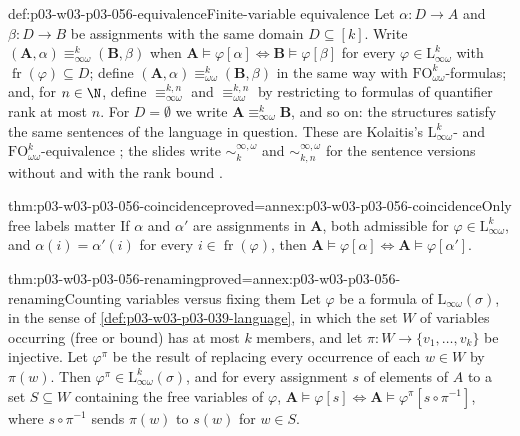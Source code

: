 \begin{hbdefinition}{def:p03-w03-p03-056-equivalence}{Finite-variable equivalence}
Let \(\alpha:D\to A\) and \(\beta:D\to B\) be assignments with the same
domain \(D\subseteq[k]\). Write
\((\mathbf A,\alpha)\equiv^k_{\infty\omega}(\mathbf B,\beta)\) when
\(\mathbf A\models\varphi[\alpha]\iff\mathbf B\models\varphi[\beta]\) for
every \(\varphi\in\mathrm{L}^k_{\infty\omega}\) with
\(\operatorname{fr}(\varphi)\subseteq D\); define
\((\mathbf A,\alpha)\equiv^k_{\omega\omega}(\mathbf B,\beta)\) in the same
way with \(\mathrm{FO}^k_{\omega\omega}\)-formulas; and, for \(n\in\N\),
define \(\equiv^{k,n}_{\infty\omega}\) and \(\equiv^{k,n}_{\omega\omega}\) by
restricting to formulas of quantifier rank at most \(n\). For \(D=\emptyset\)
we write \(\mathbf A\equiv^k_{\infty\omega}\mathbf B\), and so on: the
structures satisfy the same sentences of the language in question. These are
Kolaitis's \(\mathrm{L}^k_{\infty\omega}\)- and
\(\mathrm{FO}^k_{\omega\omega}\)-equivalence
\cite[Def.~7.8, p.~57]{Kolaitis2003ExpressivePowerNotes}; the slides
write \(\sim^{\infty,\omega}_{k}\) and \(\sim^{\infty,\omega}_{k,n}\) for the
sentence versions without and with the rank bound
\cite[p.~13]{TechnionLMC2009Lecture4}.
\end{hbdefinition}

\begin{hblemma}{thm:p03-w03-p03-056-coincidence}{proved=annex:p03-w03-p03-056-coincidence}{Only free labels matter}
If \(\alpha\) and \(\alpha'\) are assignments in \(\mathbf A\), both
admissible for \(\varphi\in\mathrm{L}^k_{\infty\omega}\), and
\(\alpha(i)=\alpha'(i)\) for every \(i\in\operatorname{fr}(\varphi)\), then
\(\mathbf A\models\varphi[\alpha]\iff\mathbf A\models\varphi[\alpha']\).
\end{hblemma}

\begin{hblemma}{thm:p03-w03-p03-056-renaming}{proved=annex:p03-w03-p03-056-renaming}{Counting variables versus fixing them}
Let \(\varphi\) be a formula of \(\mathrm{L}_{\infty\omega}(\sigma)\), in the
sense of \cref{def:p03-w03-p03-039-language}, in which the set \(W\) of
variables occurring (free or bound) has at most \(k\) members, and let
\(\pi:W\to\{v_1,\ldots,v_k\}\) be injective. Let \(\varphi^\pi\) be the
result of replacing every occurrence of each \(w\in W\) by \(\pi(w)\). Then
\(\varphi^\pi\in\mathrm{L}^k_{\infty\omega}(\sigma)\), and for every
assignment \(s\) of elements of \(A\) to a set \(S\subseteq W\) containing
the free variables of \(\varphi\),
\(\mathbf A\models\varphi[s]\iff\mathbf A\models\varphi^\pi[s\circ\pi^{-1}]\),
where \(s\circ\pi^{-1}\) sends \(\pi(w)\) to \(s(w)\) for \(w\in S\).
\end{hblemma}

